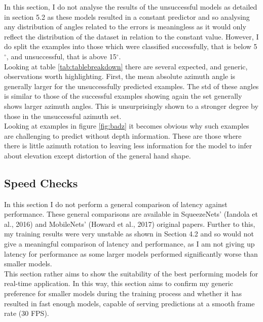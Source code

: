 \documentclass{article}
\begin{document}
{\begin{figure}[h]
\end{figure}



In this section, I do not analyse the results of the unsuccessful models as detailed in section 5.2 as these models resulted in a constant predictor and so analysing any distribution of angles related to the errors is meaningless as it would only reflect the distribution of the dataset in relation to the constant value. However, I do split the examples into those which were classified successfully, that is below 5 $^{\circ}$, and unsuccessful, that is above 15$^{\circ}$. \\

Looking at table \ref{tab:tablebreakdown} there are several expected, and generic, observations worth highlighting. First, the mean absolute azimuth angle is generally larger for the unsuccessfully predicted examples. The std of these angles is similar to those of the successful examples showing again the set generally shows larger azimuth angles. 
This is unsurprisingly shown to a stronger degree by those in the unsuccessful azimuth set. \\

Looking at examples in figure \ref{fig:badz} it becomes obvious why such examples are challenging to predict without depth information. These are those where there is little azimuth rotation to leaving less information for the model to infer about elevation except distortion of the general hand shape. \\


\subsection{Speed Checks}
In this section I do not perform a general comparison of latency against performance. These general comparisons are available in SqueezeNets' (Iandola et al., 2016) and MobileNets' (Howard et al., 2017) original papers. Further to this, my training results were very unstable as shown in Section 4.2 and so would not give a meaningful comparison of latency and performance, as I am not giving up latency for performance as some larger models performed significantly worse than smaller models. \\

This section rather aims to show the suitability of the best performing models for real-time application. In this way, this section aims to confirm my generic preference for smaller models during the training process and whether it has resulted in fast enough models, capable of serving predictions at a smooth frame rate (30 FPS).\\

}
\end{document}
